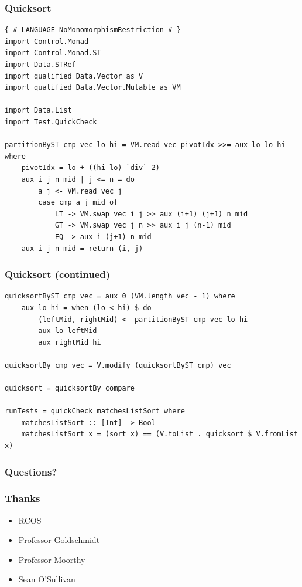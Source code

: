 \documentclass{beamer}
\begin{document}
\begin{frame}[fragile]
\frametitle{Quicksort}
\begin{Verbatim}[frame=single, fontsize=\scriptsize]
{-# LANGUAGE NoMonomorphismRestriction #-}
import Control.Monad
import Control.Monad.ST
import Data.STRef
import qualified Data.Vector as V
import qualified Data.Vector.Mutable as VM

import Data.List
import Test.QuickCheck

partitionByST cmp vec lo hi = VM.read vec pivotIdx >>= aux lo lo hi where
    pivotIdx = lo + ((hi-lo) `div` 2)
    aux i j n mid | j <= n = do
        a_j <- VM.read vec j
        case cmp a_j mid of
            LT -> VM.swap vec i j >> aux (i+1) (j+1) n mid
            GT -> VM.swap vec j n >> aux i j (n-1) mid
            EQ -> aux i (j+1) n mid
    aux i j n mid = return (i, j)
\end{Verbatim}
\end{frame}

\begin{frame}[fragile]
\frametitle{Quicksort (continued)}
\begin{Verbatim}[frame=single, fontsize=\scriptsize]
quicksortByST cmp vec = aux 0 (VM.length vec - 1) where
    aux lo hi = when (lo < hi) $ do
        (leftMid, rightMid) <- partitionByST cmp vec lo hi
        aux lo leftMid
        aux rightMid hi

quicksortBy cmp vec = V.modify (quicksortByST cmp) vec

quicksort = quicksortBy compare

runTests = quickCheck matchesListSort where 
    matchesListSort :: [Int] -> Bool
    matchesListSort x = (sort x) == (V.toList . quicksort $ V.fromList x)
\end{Verbatim}
\end{frame}

\begin{frame}[fragile]
\frametitle{Questions?}
\end{frame}

\begin{frame}[fragile]
\frametitle{Thanks}
\begin{itemize}
\item RCOS
\item Professor Goldschmidt
\item Professor Moorthy
\item Sean O'Sullivan
\end{itemize}
\end{frame}
\end{document}
